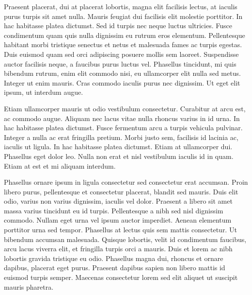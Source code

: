 Praesent placerat, dui at placerat lobortis, magna elit facilisis lectus, at iaculis purus turpis sit amet nulla.
Mauris feugiat dui facilisis elit molestie porttitor.
In hac habitasse platea dictumst.
Sed id turpis nec neque luctus ultricies.
Fusce condimentum quam quis nulla dignissim eu rutrum eros elementum.
Pellentesque habitant morbi tristique senectus et netus et malesuada fames ac turpis egestas.
Duis euismod quam sed orci adipiscing posuere mollis sem laoreet.
Suspendisse auctor facilisis neque, a faucibus purus luctus vel.
Phasellus tincidunt, mi quis bibendum rutrum, enim elit commodo nisi, eu ullamcorper elit nulla sed metus.
Integer ut enim mauris.
Cras commodo iaculis purus nec dignissim.
Ut eget elit ipsum, ut interdum augue.

Etiam ullamcorper mauris ut odio vestibulum consectetur.
Curabitur at arcu est, ac commodo augue.
Aliquam nec lacus vitae nulla rhoncus varius in id urna.
In hac habitasse platea dictumst.
Fusce fermentum arcu a turpis vehicula pulvinar.
Integer a nulla ac erat fringilla pretium.
Morbi justo sem, facilisis id lacinia ac, iaculis ut ligula.
In hac habitasse platea dictumst.
Etiam at ullamcorper dui.
Phasellus eget dolor leo.
Nulla non erat et nisl vestibulum iaculis id in quam.
Etiam at est et mi aliquam interdum.

Phasellus ornare ipsum in ligula consectetur sed consectetur erat accumsan.
Proin libero purus, pellentesque et consectetur placerat, blandit sed mauris.
Duis elit odio, varius non varius dignissim, iaculis vel dolor.
Praesent a libero sit amet massa varius tincidunt eu id turpis.
Pellentesque a nibh sed nisl dignissim commodo.
Nullam eget urna vel ipsum auctor imperdiet.
Aenean elementum porttitor urna sed tempor.
Phasellus at lectus quis sem mattis consectetur.
Ut bibendum accumsan malesuada.
Quisque lobortis, velit id condimentum faucibus, arcu lacus viverra elit, et fringilla turpis orci a mauris.
Duis et lorem ac nibh lobortis gravida tristique eu odio.
Phasellus magna dui, rhoncus et ornare dapibus, placerat eget purus.
Praesent dapibus sapien non libero mattis id euismod turpis semper.
Maecenas consectetur lorem sed elit aliquet ut suscipit mauris pharetra.